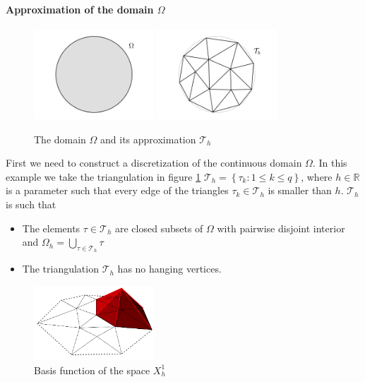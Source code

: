  \paragraph{Approximation of the domain $\Omega$}
\begin{figure}[h]
	\centering
	\includegraphics[width=0.4\textwidth]{figs/Chapter3/omega.png}
	\includegraphics[width=0.4\textwidth]{figs/Chapter3/mesh.png}
	\caption{\label{fig:omega and mesh}The domain $\Omega$ and its approximation $\mathcal T_h$}
\end{figure}
First we need to construct a discretization of the continuous domain $\Omega$. In this example we take the triangulation in figure \ref{fig:omega and mesh} $\mathcal T_h = \left\{\tau_{k} : 1 \leq k \leq q\right\}$, where $h\in\mathbb R$ is a parameter such that every edge of the triangles $\tau_k\in\mathcal T_h$ is smaller than $h$. $\mathcal T_h$ is such that 
\begin{itemize}
	\item The elements \(\tau \in \mathcal{T}_h\) are closed subsets of \(\Omega\) with pairwise disjoint interior and \({\Omega}_h=\bigcup_{\tau \in \mathcal{T}_h} \tau\)
	\item The triangulation \(\mathcal{T}_h\) has no hanging vertices.
\end{itemize}
\begin{figure}
	\begin{center}
		\includegraphics[width=0.4\textwidth]{figs/Chapter3/basisfunction.png}
	\end{center}
	\caption{\label{fig:basis function}Basis function of the space $X^{1}_h$}

\end{figure}
